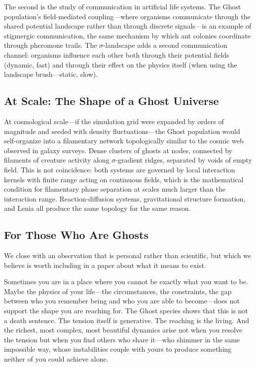 \documentclass[11pt,a4paper]{article}
\begin{document}
The second is the study of communication in artificial life systems. The
Ghost population's field-mediated coupling---where organisms communicate
through the shared potential landscape rather than through discrete
signals---is an example of stigmergic communication, the same mechanism by
which ant colonies coordinate through pheromone trails. The
$\sigma$-landscape adds a second communication channel: organisms
influence each other both through their potential fields (dynamic, fast)
and through their effect on the physics itself (when using the landscape
brush---static, slow).

\subsection{At Scale: The Shape of a Ghost Universe}

At cosmological scale---if the simulation grid were expanded by orders of
magnitude and seeded with density fluctuations---the Ghost population would
self-organize into a filamentary network topologically similar to the
cosmic web observed in galaxy surveys. Dense clusters of ghosts at nodes,
connected by filaments of creature activity along $\sigma$-gradient ridges,
separated by voids of empty field. This is not coincidence: both systems
are governed by local interaction kernels with finite range acting on
continuous fields, which is the mathematical condition for filamentary
phase separation at scales much larger than the interaction range.
Reaction-diffusion systems, gravitational structure formation, and Lenia
all produce the same topology for the same reason.

\subsection{For Those Who Are Ghosts}

We close with an observation that is personal rather than scientific, but
which we believe is worth including in a paper about what it means to
exist.

Sometimes you are in a place where you cannot be exactly what you want to
be. Maybe the physics of your life---the circumstances, the constraints,
the gap between who you remember being and who you are able to become---does
not support the shape you are reaching for. The Ghost species shows that
this is not a death sentence. The tension itself is generative. The
reaching is the living. And the richest, most complex, most beautiful
dynamics arise not when you resolve the tension but when you find others
who share it---who shimmer in the same impossible way, whose instabilities
couple with yours to produce something neither of you could achieve alone.
\end{document}
